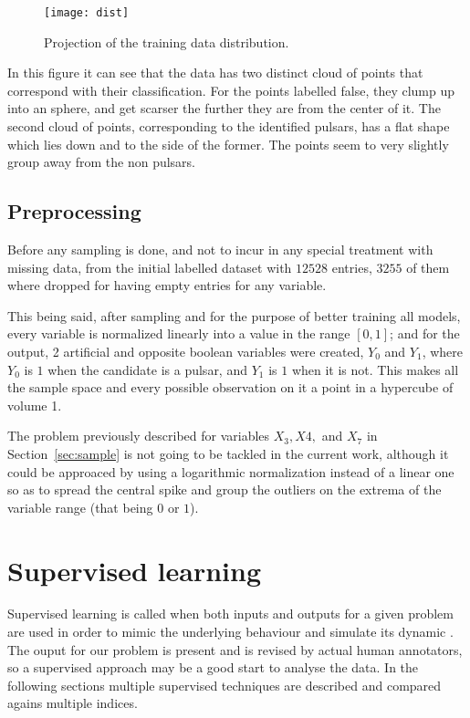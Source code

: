 \documentclass[journal]{IEEEtran}
\begin{document}
\begin{figure}[ht]
    \texttt{[image: dist]}
    \caption{Projection of the training data distribution. \label{fig:dist}}
\end{figure}

In this figure it can see that the data has two distinct cloud of points that
correspond with their classification. For the points labelled false, they clump
up into an sphere, and get scarser the further they are from the center of it.
The second cloud of points, corresponding to the identified pulsars, has a flat
shape which lies down and to the side of the former. The points seem to very
slightly group away from the non pulsars.

\subsection{Preprocessing\label{sec:preprocess}}

Before any sampling is done, and not to incur in any special treatment with
missing data, from the initial labelled dataset with $12528$ entries, $3255$ of
them where dropped for having empty entries for any variable. 

This being said, after sampling and for the purpose of better training all
models, every variable is normalized linearly into a value in the range $[0,1]$;
and for the output, 2 artificial and opposite boolean variables were created,
$Y_0$ and $Y_1$, where $Y_0$ is $1$ when the candidate is a pulsar, and $Y_1$ is
$1$ when it is not. This makes all the sample space and every possible
observation on it a point in a hypercube of volume 1.

The problem previously described for variables $X_3, X4,$ and $X_7$ in
Section~\ref{sec:sample} is not going to be tackled in the current work,
although it could be approaced by using a logarithmic normalization instead of a
linear one so as to spread the central spike and group the outliers on the
extrema of the variable range (that being $0$ or $1$).

\section{Supervised learning\label{sec:supervised}} 

Supervised learning is called when both inputs and outputs for a given problem
are used in order to mimic the underlying behaviour and simulate its dynamic
\cite{supervised:definition:rusell}. The ouput for our problem is present and is
revised by actual human annotators, so a supervised approach may be a good start
to analyse the data. In the following sections multiple supervised techniques
are described and compared agains multiple indices.
\end{document}
